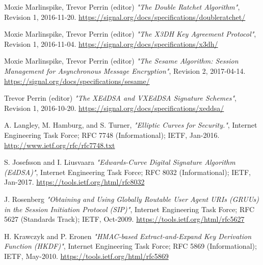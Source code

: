 \documentclass[a4paper,11pt]{article}
\begin{document}
\newpage
\begin{thebibliography}{99}

  Moxie Marlinspike, Trevor Perrin (editor)
  \textit{\: "The Double Ratchet Algorithm"},
  Revision 1,
  2016-11-20.
  \href{https://signal.org/docs/specifications/doubleratchet/}{https://signal.org/docs/specifications/doubleratchet/}

  Moxie Marlinspike, Trevor Perrin (editor)
  \textit{\: "The X3DH Key Agreement Protocol"},
  Revision 1,
  2016-11-04.
  \href{https://signal.org/docs/specifications/x3dh/}{https://signal.org/docs/specifications/x3dh/} 

  Moxie Marlinspike, Trevor Perrin (editor)
  \textit{\: "The Sesame Algorithm: Session Management for Asynchronous Message Encryption"},
  Revision 2,
  2017-04-14.
  \href{https://signal.org/docs/specifications/sesame/}{https://signal.org/docs/specifications/sesame/}

  Trevor Perrin (editor)
  \textit{\: "The XEdDSA and VXEdDSA Signature Schemes"},
  Revision 1,
  2016-10-20.
  \href{https://signal.org/docs/specifications/xeddsa/}{https://signal.org/docs/specifications/xeddsa/}

  A. Langley, M. Hamburg, and S. Turner,
  \textit{\: "Elliptic Curves for Security."},
  Internet Engineering Task Force; RFC 7748 (Informational); IETF, Jan-2016.
  \href{http://www.ietf.org/rfc/rfc7748.txt}{http://www.ietf.org/rfc/rfc7748.txt}
  
  S. Josefsson and I. Liusvaara
  \textit{\: "Edwards-Curve Digital Signature Algorithm (EdDSA)"},
  Internet Engineering Task Force; RFC 8032 (Informational); IETF, Jan-2017.
  \href{https://tools.ietf.org/html/rfc8032}{https://tools.ietf.org/html/rfc8032}

  J. Rosenberg
  \textit{\:"Obtaining and Using Globally Routable User Agent URIs (GRUUs) in the Session Initiation Protocol (SIP)"},
  Internet Engineering Task Force; RFC 5627 (Standards Track); IETF, Oct-2009.
  \href{https://tools.ietf.org/html/rfc5627}{https://tools.ietf.org/html/rfc5627}
  
  H. Krawczyk and P. Eronen
  \textit{\:"HMAC-based Extract-and-Expand Key Derivation Function (HKDF)"},
  Internet Engineering Task Force; RFC 5869 (Informational); IETF, May-2010.
  \href{https://tools.ietf.org/html/rfc5869}{https://tools.ietf.org/html/rfc5869}
  

\end{thebibliography}
\end{document}
